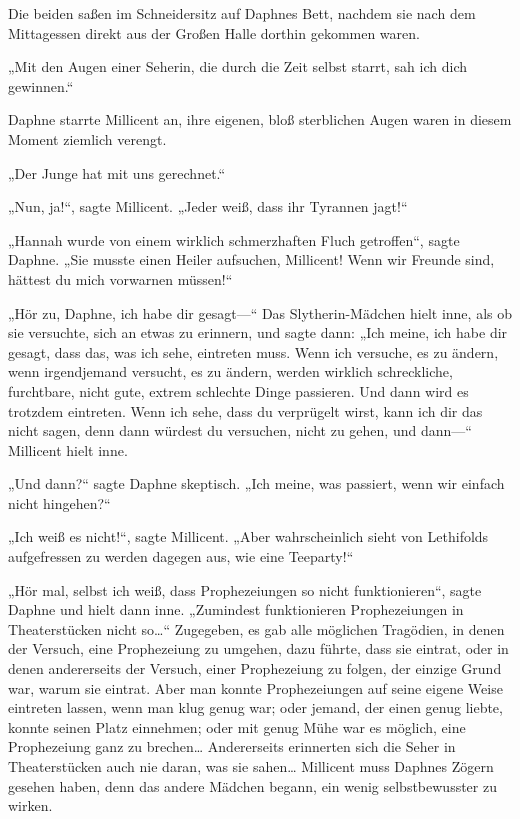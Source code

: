 {Die beiden saßen im Schneidersitz auf Daphnes Bett, nachdem sie nach dem Mittagessen direkt aus der Großen Halle dorthin gekommen waren.

„Mit den Augen einer Seherin, die durch die Zeit selbst starrt, sah ich dich gewinnen.“

Daphne starrte Millicent an, ihre eigenen, bloß sterblichen Augen waren in diesem Moment ziemlich verengt.

„Der Junge hat mit uns gerechnet.“

„Nun, ja!“, sagte Millicent. „Jeder weiß, dass ihr Tyrannen jagt!“

„Hannah wurde von einem wirklich schmerzhaften Fluch getroffen“, sagte Daphne. „Sie musste einen Heiler aufsuchen, Millicent! Wenn wir Freunde sind, hättest du mich vorwarnen müssen!“

„Hör zu, Daphne, ich habe dir gesagt—“ Das Slytherin-Mädchen hielt inne, als ob sie versuchte, sich an etwas zu erinnern, und sagte dann: „Ich meine, ich habe dir gesagt, dass das, was ich sehe, eintreten muss. Wenn ich versuche, es zu ändern, wenn irgendjemand versucht, es zu ändern, werden wirklich schreckliche, furchtbare, nicht gute, extrem schlechte Dinge passieren. Und dann wird es trotzdem eintreten. Wenn ich sehe, dass du verprügelt wirst, kann ich dir das nicht sagen, denn dann würdest du versuchen, nicht zu gehen, und dann—“ Millicent hielt inne.

„Und dann?“ sagte Daphne skeptisch. „Ich meine, was passiert, wenn wir einfach nicht hingehen?“

„Ich weiß es nicht!“, sagte Millicent. „Aber wahrscheinlich sieht von Lethifolds aufgefressen zu werden dagegen aus, wie eine Teeparty!“

„Hör mal, selbst ich weiß, dass Prophezeiungen so nicht funktionieren“, sagte Daphne und hielt dann inne. „Zumindest funktionieren Prophezeiungen in Theaterstücken nicht so…“ Zugegeben, es gab alle möglichen Tragödien, in denen der Versuch, eine Prophezeiung zu umgehen, dazu führte, dass sie eintrat, oder in denen andererseits der Versuch, einer Prophezeiung zu folgen, der einzige Grund war, warum sie eintrat. Aber man konnte Prophezeiungen auf seine eigene Weise eintreten lassen, wenn man klug genug war; oder jemand, der einen genug liebte, konnte seinen Platz einnehmen; oder mit genug Mühe war es möglich, eine Prophezeiung ganz zu brechen… Andererseits erinnerten sich die Seher in Theaterstücken auch nie daran, was sie sahen… Millicent muss Daphnes Zögern gesehen haben, denn das andere Mädchen begann, ein wenig selbstbewusster zu wirken.

}
